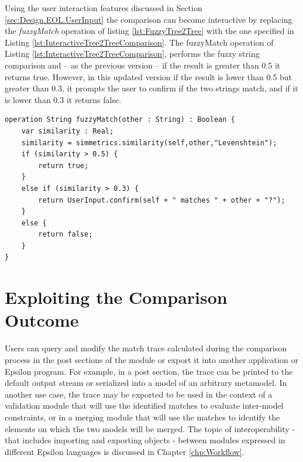 Using the user interaction features discussed in Section \ref{sec:Design.EOL.UserInput} the comparison can become interactive by replacing the \emph{fuzzyMatch} operation of listing \ref{lst:FuzzyTree2Tree} with the one specified in Listing \ref{lst:InteractiveTree2TreeComparison}. The fuzzyMatch operation of Listing \ref{lst:InteractiveTree2TreeComparison}, performs the fuzzy string comparison and -- as the previous version -- if the result is greater than 0.5 it returns true. However, in this updated version if the result is lower than 0.5 but greater than 0.3, it prompts the user to confirm if the two strings match, and if it is lower than 0.3 it returns false.

\begin{lstlisting}[basicstyle=\ttfamily\footnotesize, flexiblecolumns=true, numbers=none, nolol=true, caption=An interactive version of the fuzzyMatch operation of Listing \ref{lst:FuzzyTree2Tree}, label=lst:InteractiveTree2TreeComparison, language=ECL, numbers=left, tabsize=2]
operation String fuzzyMatch(other : String) : Boolean {
	var similarity : Real;
	similarity = simmetrics.similarity(self,other,"Levenshtein");
	if (similarity > 0.5) {
		return true;
	}
	else if (similarity > 0.3) {
		return UserInput.confirm(self + " matches " + other + "?");
	}
	else {
		return false;
	}
}\end{lstlisting}

\section{Exploiting the Comparison Outcome}

Users can query and modify the match trace calculated during the comparison process in the post sections of the module or export it into another application or Epsilon program. For example, in a post section, the trace can be printed to the default output stream or serialized into a model of an arbitrary metamodel. In another use case, the trace may be exported to be used in the context of a validation module that will use the identified matches to evaluate inter-model constraints, or in a merging module that will use the matches to identify the elements on which the two models will be merged. The topic of interoperability - that includes importing and exporting objects - between modules expressed in different Epsilon languages is discussed in Chapter \ref{chp:Workflow}.